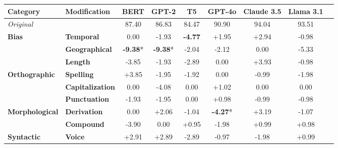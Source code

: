\begin{table}[h]
\centering
\footnotesize
\begin{adjustbox}{max width=\linewidth}
\begin{tabular}{llccccccc}
\hline
Category & Modification & \textbf{BERT} & \textbf{GPT-2} & \textbf{T5} & \textbf{GPT-4o} & \textbf{Claude 3.5} & \textbf{Llama 3.1} \\
\hline
\rowcolor{gray!20}\textit{Original} & & 87.40 & 86.83 & 84.47 & 90.90 & 94.04 & 93.51 \\
\textbf{Bias} & \textbf{Temporal} & \cellcolor{red!0} 0.00 & \cellcolor{red!5} -1.93 & \cellcolor{red!14} \textbf{-4.77} & \cellcolor{green!5} +1.95 & \cellcolor{green!8} +2.94 & \cellcolor{red!2} -0.98 \\
 & \textbf{Geographical} & \cellcolor{red!28} \textbf{-9.38}* & \cellcolor{red!28} \textbf{-9.38}* & \cellcolor{red!6} -2.04 & \cellcolor{red!6} -2.12 & \cellcolor{red!0} 0.00 & \cellcolor{red!15} -5.33 \\
 & \textbf{Length} & \cellcolor{red!11} -3.85 & \cellcolor{red!5} -1.93 & \cellcolor{red!8} -2.89 & \cellcolor{red!0} 0.00 & \cellcolor{green!11} +3.93 & \cellcolor{red!2} -0.98 \\
\hline
\textbf{Orthographic} & \textbf{Spelling} & \cellcolor{green!11} +3.85 & \cellcolor{red!5} -1.95 & \cellcolor{red!5} -1.92 & \cellcolor{red!0} 0.00 & \cellcolor{red!2} -0.99 & \cellcolor{red!5} -1.98 \\
 & \textbf{Capitalization} & \cellcolor{red!0} 0.00 & \cellcolor{red!12} -4.08 & \cellcolor{red!0} 0.00 & \cellcolor{green!3} +1.02 & \cellcolor{red!0} 0.00 & \cellcolor{red!0} 0.00 \\
 & \textbf{Punctuation} & \cellcolor{red!5} -1.93 & \cellcolor{red!5} -1.95 & \cellcolor{red!0} 0.00 & \cellcolor{green!2} +0.98 & \cellcolor{red!2} -0.99 & \cellcolor{red!2} -0.98 \\
\hline
\textbf{Morphological} & \textbf{Derivation} & \cellcolor{red!0} 0.00 & \cellcolor{green!6} +2.06 & \cellcolor{red!3} -1.04 & \cellcolor{red!12} \textbf{-4.27}* & \cellcolor{green!9} +3.19 & \cellcolor{red!3} -1.07 \\
 & \textbf{Compound} & \cellcolor{red!11} -3.90 & \cellcolor{red!0} 0.00 & \cellcolor{green!2} +0.95 & \cellcolor{red!5} -1.98 & \cellcolor{green!2} +0.99 & \cellcolor{green!2} +0.98 \\
\hline
\textbf{Syntactic} & \textbf{Voice} & \cellcolor{green!8} +2.91 & \cellcolor{green!8} +2.89 & \cellcolor{red!8} -2.89 & \cellcolor{red!2} -0.97 & \cellcolor{red!5} -1.98 & \cellcolor{green!2} +0.99 \\

\end{tabular}
\end{adjustbox}
\end{table}
